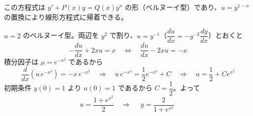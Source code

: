 
この方程式は $y' + P(x)y = Q(x)y^{n}$ の形（ベルヌーイ型）であり、$u = y^{1-n}$ の置換により線形方程式に帰着できる。

$n = 2$ のベルヌーイ型。両辺を $y^{2}$ で割り、$u = y^{-1}$（$\dfrac{du}{dx} = -y^{-2}\dfrac{dy}{dx}$）とおくと
\[
-\frac{du}{dx} + 2xu = x
\quad\Longleftrightarrow\quad
\frac{du}{dx} - 2xu = -x
\]
積分因子は $\mu = e^{-x^{2}}$ であるから
\[
\frac{d}{dx}\left(u\,e^{-x^{2}}\right) = -x\,e^{-x^{2}}
\quad\Longrightarrow\quad
u\,e^{-x^{2}} = \frac{1}{2}e^{-x^{2}} + C
\quad\Longrightarrow\quad
u = \frac{1}{2} + Ce^{x^{2}}
\]
初期条件 $y(0) = 1$ より $u(0) = 1$ であるから $C = \dfrac{1}{2}$。よって
\[
u = \frac{1 + e^{x^{2}}}{2}
\quad\Longrightarrow\quad
\boxed{\; y = \frac{2}{1 + e^{x^{2}}} \;}
\]
